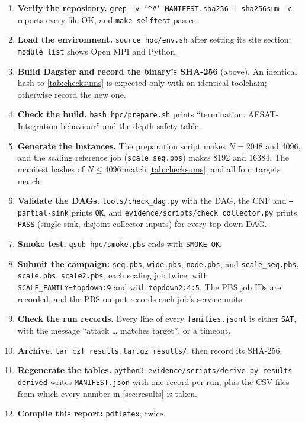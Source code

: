 \documentclass[11pt,a4paper]{article}
\begin{document}
\begin{enumerate}
\item \textbf{Verify the repository.} \texttt{grep -v '\^{}\#' MANIFEST.sha256 | sha256sum -c} reports
      every file OK, and \texttt{make selftest} passes.
\item \textbf{Load the environment.} \texttt{source hpc/env.sh} after setting its site section;
      \texttt{module list} shows Open MPI and Python.
\item \textbf{Build Dagster and record the binary's SHA-256} (above). An identical hash to
      \cref{tab:checksums} is expected only with an identical toolchain; otherwise record the
      new one.
\item \textbf{Check the build.} \texttt{bash hpc/prepare.sh} prints ``termination:
      AFSAT-Integration behaviour'' and the depth-safety table.
\item \textbf{Generate the instances.} The preparation script makes $N=2048$ and 4096, and the scaling
      reference job (\texttt{scale\_seq.pbs}) makes 8192 and 16384. The manifest hashes of $N\le 4096$
      match \cref{tab:checksums}, and all four targets match.
\item \textbf{Validate the DAGs.} \texttt{tools/check\_dag.py} with the DAG, the CNF and \texttt{--partial-sink} prints
      \texttt{OK}, and \texttt{evidence/scripts/check\_collector.py} prints \texttt{PASS} (single sink,
      disjoint collector inputs) for every top-down DAG.
\item \textbf{Smoke test.} \texttt{qsub hpc/smoke.pbs} ends with \texttt{SMOKE OK}.
\item \textbf{Submit the campaign:} \texttt{seq.pbs}, \texttt{wide.pbs}, \texttt{node.pbs},
      and \texttt{scale\_seq.pbs}, \texttt{scale.pbs}, \texttt{scale2.pbs}, each scaling job
      twice: with \texttt{SCALE\_FAMILY=topdown:9} and with \texttt{topdown2:4:5}. The PBS
      job IDs are recorded, and the PBS output records each job's service units.
\item \textbf{Check the run records.} Every line of every \texttt{families.jsonl} is either
      \texttt{SAT}, with the message ``attack \ldots{} matches target'', or a timeout.
\item \textbf{Archive.} \texttt{tar czf results.tar.gz results/}, then record its SHA-256.
\item \textbf{Regenerate the tables.} \texttt{python3 evidence/scripts/derive.py results derived}
      writes \texttt{MANIFEST.json} with one record per run, plus the CSV files from which
      every number in \cref{sec:results} is taken.
\item \textbf{Compile this report:} \texttt{pdflatex}, twice.
\end{enumerate}
\end{document}
